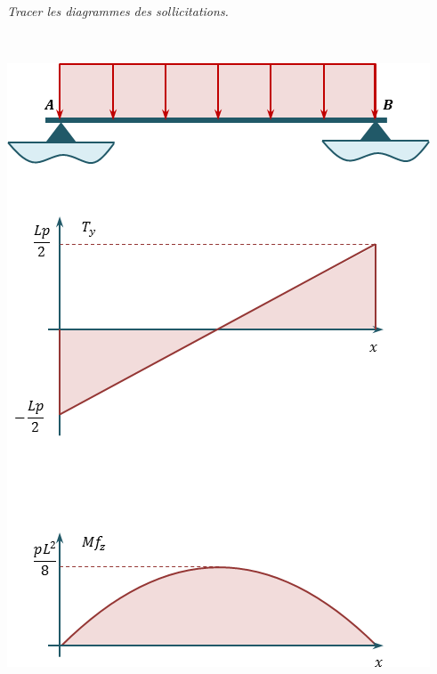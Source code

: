 \documentclass[10pt,fleqn]{article} %
\begin{document}
\subparagraph{}\textit{Tracer les diagrammes des sollicitations.}
\ifprof
\begin{corrige}
~\\
\begin{center}
\includegraphics[width=.45\textwidth]{images/fig_04}
\end{center}

\end{corrige}
\else
\fi
\end{document}

